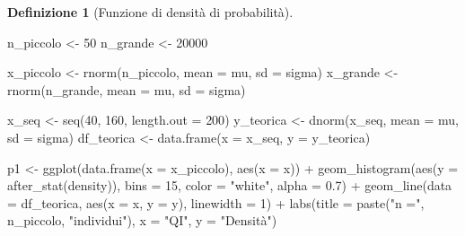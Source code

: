 \documentclass[
  italian,
  letterpaper,
  a4paper,
  11pt,
  open=any]{scrbook}
\newenvironment{Shaded}{\begin{snugshade}}{\end{snugshade}}
\newcommand{\AttributeTok}[1]{\textcolor[rgb]{0.40,0.45,0.13}{#1}}
\newcommand{\DecValTok}[1]{\textcolor[rgb]{0.68,0.00,0.00}{#1}}
\newcommand{\FloatTok}[1]{\textcolor[rgb]{0.68,0.00,0.00}{#1}}
\newcommand{\FunctionTok}[1]{\textcolor[rgb]{0.28,0.35,0.67}{#1}}
\newcommand{\NormalTok}[1]{\textcolor[rgb]{0.00,0.23,0.31}{#1}}
\newcommand{\OtherTok}[1]{\textcolor[rgb]{0.00,0.23,0.31}{#1}}
\newcommand{\SpecialCharTok}[1]{\textcolor[rgb]{0.37,0.37,0.37}{#1}}
\newcommand{\StringTok}[1]{\textcolor[rgb]{0.13,0.47,0.30}{#1}}
\theoremstyle{plain}
\theoremstyle{definition}
\theoremstyle{definition}
\newtheorem{definition}{Definizione}[chapter]
\theoremstyle{remark}
\begin{document}
\begin{definition}[Funzione di densità di
probabilità]
\begin{Shaded}
\begin{Highlighting}[]
\NormalTok{n\_piccolo }\OtherTok{\textless{}{-}} \DecValTok{50}
\NormalTok{n\_grande }\OtherTok{\textless{}{-}} \DecValTok{20000}

\NormalTok{x\_piccolo }\OtherTok{\textless{}{-}} \FunctionTok{rnorm}\NormalTok{(n\_piccolo, }\AttributeTok{mean =}\NormalTok{ mu, }\AttributeTok{sd =}\NormalTok{ sigma)}
\NormalTok{x\_grande }\OtherTok{\textless{}{-}} \FunctionTok{rnorm}\NormalTok{(n\_grande, }\AttributeTok{mean =}\NormalTok{ mu, }\AttributeTok{sd =}\NormalTok{ sigma)}

\NormalTok{x\_seq }\OtherTok{\textless{}{-}} \FunctionTok{seq}\NormalTok{(}\DecValTok{40}\NormalTok{, }\DecValTok{160}\NormalTok{, }\AttributeTok{length.out =} \DecValTok{200}\NormalTok{)}
\NormalTok{y\_teorica }\OtherTok{\textless{}{-}} \FunctionTok{dnorm}\NormalTok{(x\_seq, }\AttributeTok{mean =}\NormalTok{ mu, }\AttributeTok{sd =}\NormalTok{ sigma)}
\NormalTok{df\_teorica }\OtherTok{\textless{}{-}} \FunctionTok{data.frame}\NormalTok{(}\AttributeTok{x =}\NormalTok{ x\_seq, }\AttributeTok{y =}\NormalTok{ y\_teorica)}

\NormalTok{p1 }\OtherTok{\textless{}{-}} \FunctionTok{ggplot}\NormalTok{(}\FunctionTok{data.frame}\NormalTok{(}\AttributeTok{x =}\NormalTok{ x\_piccolo), }\FunctionTok{aes}\NormalTok{(}\AttributeTok{x =}\NormalTok{ x)) }\SpecialCharTok{+}
  \FunctionTok{geom\_histogram}\NormalTok{(}\FunctionTok{aes}\NormalTok{(}\AttributeTok{y =} \FunctionTok{after\_stat}\NormalTok{(density)), }\AttributeTok{bins =} \DecValTok{15}\NormalTok{,}
                 \AttributeTok{color =} \StringTok{"white"}\NormalTok{, }\AttributeTok{alpha =} \FloatTok{0.7}\NormalTok{) }\SpecialCharTok{+}
  \FunctionTok{geom\_line}\NormalTok{(}\AttributeTok{data =}\NormalTok{ df\_teorica, }\FunctionTok{aes}\NormalTok{(}\AttributeTok{x =}\NormalTok{ x, }\AttributeTok{y =}\NormalTok{ y),}
            \AttributeTok{linewidth =} \DecValTok{1}\NormalTok{) }\SpecialCharTok{+}
  \FunctionTok{labs}\NormalTok{(}\AttributeTok{title =} \FunctionTok{paste}\NormalTok{(}\StringTok{"n ="}\NormalTok{, n\_piccolo, }\StringTok{"individui"}\NormalTok{), }
       \AttributeTok{x =} \StringTok{"QI"}\NormalTok{, }\AttributeTok{y =} \StringTok{"Densità"}\NormalTok{) }


\end{Highlighting}
\end{Shaded}
\end{definition}
\end{document}
